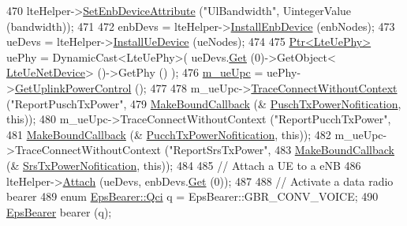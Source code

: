 \begin{DoxyCode}
470   lteHelper->\hyperlink{classns3_1_1LteHelper_ac42f0f3d6cd8473d810bfbbeb5d592e0}{SetEnbDeviceAttribute} (\textcolor{stringliteral}{"UlBandwidth"}, UintegerValue (bandwidth));
471 
472   enbDevs = lteHelper->\hyperlink{classns3_1_1LteHelper_a5e009ad35ef85f46b5a6099263f15a03}{InstallEnbDevice} (enbNodes);
473   ueDevs = lteHelper->\hyperlink{classns3_1_1LteHelper_ac9cd932d7de92811cfa953c2e3b2fc9f}{InstallUeDevice} (ueNodes);
474 
475   \hyperlink{classns3_1_1Ptr}{Ptr<LteUePhy>} uePhy = DynamicCast<LteUePhy>( ueDevs.\hyperlink{classns3_1_1NetDeviceContainer_a677d62594b5c9d2dea155cc5045f4d0b}{Get} (0)->GetObject<
      \hyperlink{classns3_1_1LteUeNetDevice}{LteUeNetDevice}> ()->GetPhy () );
476   \hyperlink{classLteUplinkPowerControlTestCase_af2fabece7259e4b60cc73d7ec02b7a3d}{m\_ueUpc} = uePhy->\hyperlink{classns3_1_1LteUePhy_a386b038c79252c3fe8408e68279fa88b}{GetUplinkPowerControl} ();
477 
478   m\_ueUpc->\hyperlink{classns3_1_1ObjectBase_a1be45f6fd561e75dcac9dfa81b2b81e4}{TraceConnectWithoutContext} (\textcolor{stringliteral}{"ReportPuschTxPower"},
479                                        \hyperlink{group__makeboundcallback_ga1725d6362e6065faa0709f7c93f8d770}{MakeBoundCallback} (&
      \hyperlink{lte-test-uplink-power-control_8cc_a2236a3f87ff177b3305bf82ff492f8ad}{PuschTxPowerNofitication}, \textcolor{keyword}{this}));
480   m\_ueUpc->TraceConnectWithoutContext (\textcolor{stringliteral}{"ReportPucchTxPower"},
481                                        \hyperlink{group__makeboundcallback_ga1725d6362e6065faa0709f7c93f8d770}{MakeBoundCallback} (&
      \hyperlink{lte-test-uplink-power-control_8cc_a4a348fa3ab0a4e65de2ddb70fe0176e3}{PucchTxPowerNofitication}, \textcolor{keyword}{this}));
482   m\_ueUpc->TraceConnectWithoutContext (\textcolor{stringliteral}{"ReportSrsTxPower"},
483                                        \hyperlink{group__makeboundcallback_ga1725d6362e6065faa0709f7c93f8d770}{MakeBoundCallback} (&
      \hyperlink{lte-test-uplink-power-control_8cc_acc0b838be35884288e3872794ca2903d}{SrsTxPowerNofitication}, \textcolor{keyword}{this}));
484 
485   \textcolor{comment}{// Attach a UE to a eNB}
486   lteHelper->\hyperlink{classns3_1_1LteHelper_a9466743f826aa2652a87907b7f0a1c87}{Attach} (ueDevs, enbDevs.\hyperlink{classns3_1_1NetDeviceContainer_a677d62594b5c9d2dea155cc5045f4d0b}{Get} (0));
487 
488   \textcolor{comment}{// Activate a data radio bearer}
489   \textcolor{keyword}{enum} \hyperlink{structns3_1_1EpsBearer_aecf0c67109c5eb4ec0b07226fff5885e}{EpsBearer::Qci} q = EpsBearer::GBR\_CONV\_VOICE;
490   \hyperlink{structns3_1_1EpsBearer}{EpsBearer} bearer (q);

\end{DoxyCode}

